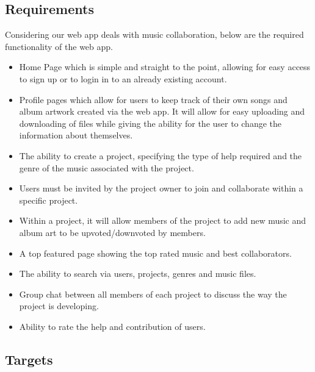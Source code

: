 \documentclass{article}
\begin{document}
\subsection{Requirements}
Considering our web app deals with music collaboration, below are the required functionality of the web app.
\begin{itemize}
  \item Home Page which is simple and straight to the point, allowing for easy access to sign up or to login in to an already existing account.
  \item Profile pages which allow for users to keep track of their own songs and album artwork created via the web app. It will allow for easy uploading and downloading of files while giving the ability for the user to change the information about themselves.
  \item The ability to create a project, specifying the type of help required and the genre of the music associated with the project.
  \item Users must be invited by the project owner to join and collaborate within a specific project.
  \item Within a project, it will allow members of the project to add new music and album art to be upvoted/downvoted by members.
  \item A top featured page showing the top rated music and best collaborators.
  \item The ability to search via users, projects, genres and music files.
  \item Group chat between all members of each project to discuss the way the project is developing.
  \item Ability to rate the help and contribution of users.
\end{itemize}
\subsection{Targets}
\end{document}
